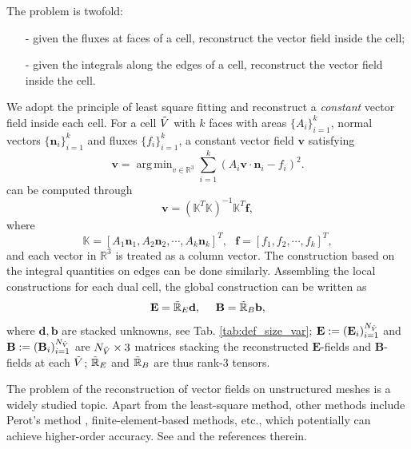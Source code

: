\documentclass{article}
\DeclareMathOperator*{\argmin}{arg\,min}
\begin{document}
The problem is twofold:
\begin{itemize}
    \item[-] given the fluxes at faces of a cell, reconstruct the vector field inside the cell;
    \item[-] given the integrals along the edges of a cell, reconstruct the vector field inside the cell. 
\end{itemize}
We adopt the principle of least square fitting and reconstruct a \emph{constant} vector field inside each cell. For a cell $\Tilde{V}$ with $k$ faces with areas $\{A_i\}_{i=1}^k$, normal vectors $\{\mathbf{n}_i\}_{i=1}^k$ and fluxes $\{f_i\}_{i=1}^k$, a constant vector field $\mathbf{v}$ satisfying 
\begin{equation*}
    \mathbf{v} = \argmin_{v\in \mathbb{R}^3} \sum_{i=1}^k(A_i\mathbf{v} \cdot \mathbf{n}_i - f_i)^2.   
\end{equation*} can be computed through
\begin{equation*}
    \mathbf{v} = (\mathbb{K}^T\mathbb{K})^{-1}\mathbb{K}^T\mathbf{f},
\end{equation*}
where
\begin{equation*}
    \mathbb{K} = [A_1\mathbf{n}_1, A_2\mathbf{n}_2, \cdots, A_k\mathbf{n}_k]^T,\ \ \ \mathbf{f} = [f_1, f_2, \cdots, f_k]^T,
\end{equation*}
and each vector in $\mathbb{R}^3$ is treated as a column vector. The construction based on the integral quantities on edges can be done similarly. Assembling the local constructions for each dual cell, the global construction can be written as 
\begin{equation}
    \mathbf{E} = \Tilde{\mathbb{R}}_E\mathbf{d},
    \ \ \ \ 
    \mathbf{B} = \Tilde{\mathbb{R}}_B\mathbf{b}, \label{equ:reconstruction}
\end{equation}
where $\mathbf{d}, \mathbf{b}$ are stacked unknowns, see Tab. \ref{tab:def_size_var}; $\mathbf{E} := (\mathbf{E}_i)_{i=1}^{N_{\Tilde{V}}}$ and $\mathbf{B} := (\mathbf{B}_i)_{i=1}^{N_{\Tilde{V}}}$ are $N_{\Tilde{V}} \times 3$ matrices stacking the reconstructed $\mathbf{E}$-fields and $\mathbf{B}$-fields at each $\Tilde{V}$; $\Tilde{\mathbb{R}}_E$ and $\Tilde{\mathbb{R}}_B$ are thus rank-3 tensors.

The problem of the reconstruction of vector fields on unstructured meshes is a widely studied topic. Apart from the least-square method, other methods include Perot's method \citep{perot_2000}, finite-element-based methods, etc., which potentially can achieve higher-order accuracy. See \cite[][sec. 3.4.4]{fuchs_2021} and the references therein.  
\end{document}
